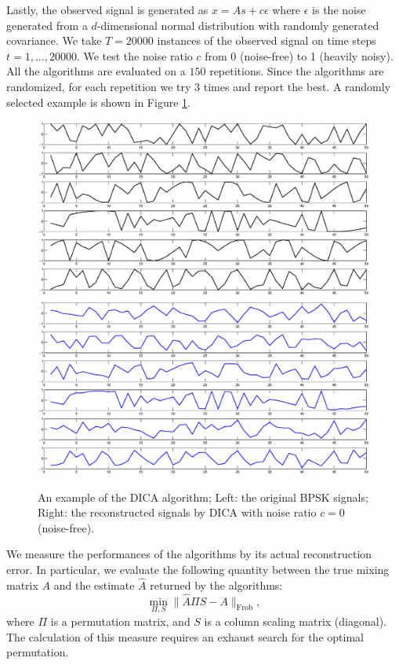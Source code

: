 \documentclass[11pt]{article}
\begin{document}
Lastly, the observed signal is generated as $x = As+c\epsilon$ where $\epsilon$ is the noise generated from a $d$-dimensional normal distribution with randomly generated covariance. 
We take $T=20000$ instances of the observed signal on time steps $t= 1,\ldots, 20000$.
We test the noise ratio $c$ from 0 (noise-free) to 1 (heavily noisy). 
All the algorithms are evaluated on a $150$ repetitions. 
Since the algorithms are randomized, for each repetition we try $3$ times and report the best.
A randomly selected example is shown in Figure \ref{fig:signalrecovered}. 

\begin{figure}[H] %
	\centering
	\includegraphics[width =0.48\columnwidth]{images/Hidden-noisefree}
	\includegraphics[width =0.48\columnwidth]{images/Reconstructed-noisefree} 
	\caption{
		\label{fig:signalrecovered}
		An example of the DICA algorithm; Left: the original BPSK signals; Right: the reconstructed signals by DICA with noise ratio $c=0$ (noise-free).}
\end{figure}

We measure the performances of the algorithms by its actual reconstruction error.
In particular, we evaluate the following quantity between the true mixing matrix $A$ and the estimate $\hat{A}$ returned by the algorithms:
\begin{equation}
\label{equ:parerror}
\min_{\Pi,S} \|\hat{A}\Pi S - A\|_{\text{Frob}},
\end{equation}
where $\Pi$ is a permutation matrix, and $S$ is a column scaling matrix (diagonal).
The calculation of this measure requires an exhaust search for the optimal permutation.
\end{document}
